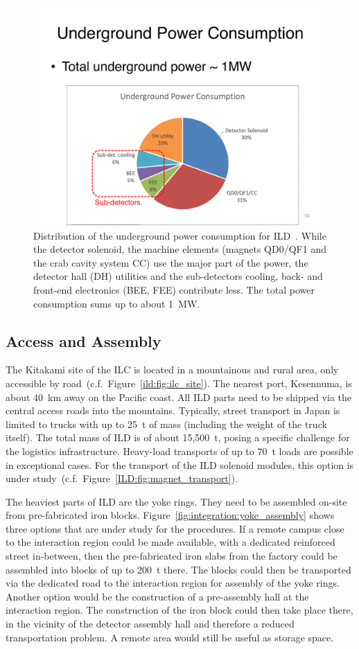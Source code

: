 \begin{figure}[h!]
\includegraphics[width=0.7\hsize]{Integration/fig/Power.pdf}
\caption{\label{fig:integration:power}Distribution of the underground power consumption for ILD~\cite{ild:bib:services}. While the detector solenoid, the machine elements (magnets QD0/QF1 and the crab cavity system CC) use the major part of the power, the detector hall (DH) utilities and the sub-detectors cooling, back- and front-end electronics (BEE, FEE) contribute less. The total power consumption sums up to about 1~MW.}
\end{figure}
\vspace{2cm}
\FloatBarrier

\subsection{Access and Assembly}
\label{ild:sec:access}
The Kitakami site of the ILC is located in a mountainous and rural area, only accessible by road~(c.f.~Figure~\ref{ild:fig:ilc_site}). The nearest port, Kesennuma, is about 40~km away on the Pacific coast. All ILD parts need to be shipped via the central access roads into the mountains. Typically, street transport in Japan is limited to trucks with up to 25~t of mass (including the weight of the truck itself). The total mass of ILD is of about 15,500~t, posing a specific challenge for the logistics infrastructure. Heavy-load transports of up to 70~t loads are possible in exceptional cases. For the transport of the ILD solenoid modules, this option is under study~(c.f.~Figure~\ref{ILD:fig:magnet_transport}).

The heaviest parts of ILD are the yoke rings. They need to be assembled on-site from pre-fabricated iron blocks. Figure~\ref{fig:integration:yoke_assembly} shows three options that are under study for the procedures. If a remote campus close to the interaction region could be made available, with a dedicated reinforced street in-between, then the pre-fabricated iron slabs from the factory could be assembled into blocks of up to 200~t there. The blocks could then be transported via the dedicated road to the interaction region for assembly of the yoke rings. Another option would be the construction of a pre-assembly hall at the interaction region. The construction of the iron block could then take place there, in the vicinity of the detector assembly hall and therefore a reduced transportation problem. A remote area would still be useful as storage space. 

